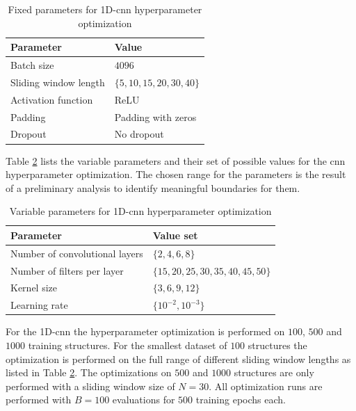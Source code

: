 \documentclass[conference]{IEEEtran}
\begin{document}
\begin{table}[htp]
	\centering
	\caption{Fixed parameters for 1D-\gls{cnn} hyperparameter optimization}
	\label{tab:fixed_parameters_cnn_optimization}
	\begin{tabular}{ll}
		\textbf{Parameter} & \textbf{Value} \\
		\hline
		Batch size & $ 4096 $ \\
		Sliding window length & $ \{5, 10, 15, 20, 30, 40\} $ \\
		Activation function & ReLU \\
		Padding & Padding with zeros \\
		Dropout & No dropout
	\end{tabular}
\end{table}

Table \ref{tab:variable_parameters_cnn_optimization} lists the variable parameters and their set of possible values for the \gls{cnn} hyperparameter optimization. The chosen range for the parameters is the result of a preliminary analysis to identify meaningful boundaries for them.

\begin{table}[htp]
	\centering
	\caption{Variable parameters for 1D-\gls{cnn} hyperparameter optimization}
	\label{tab:variable_parameters_cnn_optimization}
	\begin{tabular}{ll}
		\textbf{Parameter} & \textbf{Value set} \\
		\hline
		Number of convolutional layers & $ \{2, 4, 6, 8\} $ \\
		Number of filters per layer & $ \{15, 20, 25, 30, 35, 40, 45, 50\} $ \\
		Kernel size & $ \{3, 6, 9, 12\} $ \\
		Learning rate & $ \{10^{-2}, 10^{-3}\} $
	\end{tabular}
\end{table}

For the 1D-\gls{cnn} the hyperparameter optimization is performed on $ 100 $, $ 500 $ and $ 1000 $  training structures. For the smallest dataset of $ 100 $ structures the optimization is performed on the full range of different sliding window lengths as listed in Table \ref{tab:variable_parameters_cnn_optimization}. The optimizations on $ 500 $ and $ 1000 $ structures are only performed with a sliding window size of $ N = 30 $. All optimization runs are performed with $ B = 100 $ evaluations for $ 500 $ training epochs each.
\end{document}
